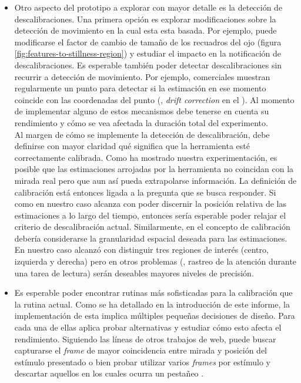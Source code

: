 \begin{itemize}
  \item
    Otro aspecto del prototipo a explorar con mayor detalle es la
    detección de descalibraciones.
    Una primera opción es explorar modificaciones sobre la detección de
    movimiento en la cual esta esta basada.
    Por ejemplo, puede modificarse el factor de cambio de tamaño de los
    recuadros del ojo (figura \ref{fig:features-to-stillness-region}) y
    estudiar el impacto en la notificación de descalibraciones.
    Es esperable también poder detectar descalibraciones sin recurrir a
    detección de movimiento.
    Por ejemplo, \eyetrackers comerciales muestran regularmente un punto para
    detectar si la estimación en ese momento coincide con las coordenadas del
    punto (\eg, \textit{drift correction} en el \eyetracker \eyelink).
    Al momento de implementar alguno de estos mecanismos debe tenerse en cuenta
    su rendimiento y cómo se vea afectada la duración total del experimento. \\
    Al margen de cómo se implemente la detección de descalibración, debe
    definirse con mayor claridad qué significa que la herramienta esté
    correctamente calibrada.
    Como ha mostrado nuestra experimentación, es posible que las estimaciones
    arrojadas por la herramienta no coincidan con la mirada real pero que aun
    así pueda extrapolarse información.
    La definición de calibración está entonces ligada a la pregunta que se
    busca responder.
    Si como en nuestro caso alcanza con poder discernir la posición relativa de
    las estimaciones a lo largo del tiempo, entonces sería esperable poder
    relajar el criterio de descalibración actual.
    Similarmente, en el concepto de calibración debería considerarse la
    granularidad espacial deseada para las estimaciones.
    En nuestro caso alcanzó con distinguir tres regiones de interés (centro,
    izquierda y derecha) pero en otros problemas (\eg, rastreo de la atención
    durante una tarea de lectura) serán deseables mayores niveles de precisión.

  \item Es esperable poder encontrar rutinas más sofisticadas para la
calibración que la rutina actual.
  Como se ha detallado en la introducción de este informe, la implementación de
esta implica múltiples pequeñas decisiones de diseño.
  Para cada una de ellas aplica probar alternativas y estudiar cómo esto afecta
el rendimiento.
  Siguiendo las líneas de otros trabajos de \eyetracking web, puede buscar
capturarse el \textit{frame} de mayor coincidencia entre mirada y posición del
estímulo presentado \cite{huang_2016_pace} o bien probar utilizar varios
\textit{frames} por estímulo y descartar aquellos en los cuales ocurra un
pestañeo \cite{xu_2015_turker_gaze}. 


\end{itemize}
